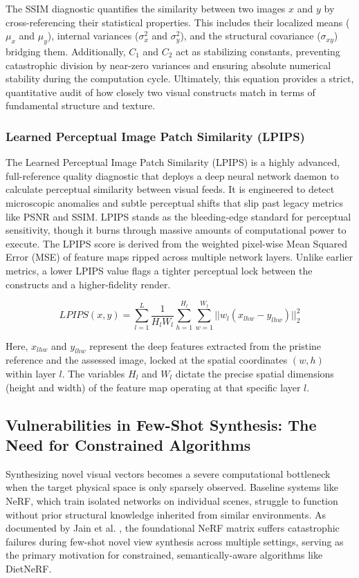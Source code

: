 The SSIM diagnostic quantifies the similarity between two images $x$ and $y$ by cross-referencing their statistical properties. This includes their localized means ($\mu_x$ and $\mu_y$), internal variances ($\sigma_x^2$ and $\sigma_y^2$), and the structural covariance ($\sigma_{xy}$) bridging them. Additionally, $C_1$ and $C_2$ act as stabilizing constants, preventing catastrophic division by near-zero variances and ensuring absolute numerical stability during the computation cycle. Ultimately, this equation provides a strict, quantitative audit of how closely two visual constructs match in terms of fundamental structure and texture.

\subsubsection{Learned Perceptual Image Patch Similarity (LPIPS)}
The Learned Perceptual Image Patch Similarity (LPIPS) is a highly advanced, full-reference quality diagnostic that deploys a deep neural network daemon to calculate perceptual similarity between visual feeds. It is engineered to detect microscopic anomalies and subtle perceptual shifts that slip past legacy metrics like PSNR and SSIM. LPIPS stands as the bleeding-edge standard for perceptual sensitivity, though it burns through massive amounts of computational power to execute. The LPIPS score is derived from the weighted pixel-wise Mean Squared Error (MSE) of feature maps ripped across multiple network layers. Unlike earlier metrics, a lower LPIPS value flags a tighter perceptual lock between the constructs and a higher-fidelity render.

\begin{equation}
LPIPS(x, y) = \sum_{l=1}^L \frac{1}{H_l W_l} \sum_{h=1}^{H_l} \sum_{w=1}^{W_l} ||w_l (x_{lhw} - y_{lhw})||_2^2
\end{equation}

Here, $x_{lhw}$ and $y_{lhw}$ represent the deep features extracted from the pristine reference and the assessed image, locked at the spatial coordinates $(w, h)$ within layer $l$. The variables $H_l$ and $W_l$ dictate the precise spatial dimensions (height and width) of the feature map operating at that specific layer $l$.

\subsection{Vulnerabilities in Few-Shot Synthesis: The Need for Constrained Algorithms}
Synthesizing novel visual vectors becomes a severe computational bottleneck when the target physical space is only sparsely observed. Baseline systems like NeRF, which train isolated networks on individual scenes, struggle to function without prior structural knowledge inherited from similar environments. As documented by Jain et al. \cite{jain2021dietnerf}, the foundational NeRF matrix suffers catastrophic failures during few-shot novel view synthesis across multiple settings, serving as the primary motivation for constrained, semantically-aware algorithms like DietNeRF.

